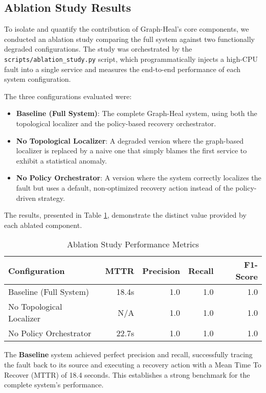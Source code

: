 \documentclass[11pt,conference]{IEEEtran}
\begin{document}
\subsection{Ablation Study Results}
To isolate and quantify the contribution of Graph-Heal's core components, we conducted an ablation study comparing the full system against two functionally degraded configurations. The study was orchestrated by the \texttt{scripts/ablation\_study.py} script, which programmatically injects a high-CPU fault into a single service and measures the end-to-end performance of each system configuration.

The three configurations evaluated were:
\begin{itemize}
    \item \textbf{Baseline (Full System)}: The complete Graph-Heal system, using both the topological localizer and the policy-based recovery orchestrator.
    \item \textbf{No Topological Localizer}: A degraded version where the graph-based localizer is replaced by a naive one that simply blames the first service to exhibit a statistical anomaly.
    \item \textbf{No Policy Orchestrator}: A version where the system correctly localizes the fault but uses a default, non-optimized recovery action instead of the policy-driven strategy.
\end{itemize}

The results, presented in Table \ref{tab:ablation-results}, demonstrate the distinct value provided by each ablated component.

\begin{table}[ht]
  \centering
  \caption{Ablation Study Performance Metrics}
  \label{tab:ablation-results}
  \begin{tabular}{lrrrr}
    \hline
    \textbf{Configuration} & \textbf{MTTR} & \textbf{Precision} & \textbf{Recall} & \textbf{F1-Score} \\
    \hline
    Baseline (Full System) & 18.4s & 1.0 & 1.0 & 1.0 \\
    No Topological Localizer & N/A & 1.0 & 1.0 & 1.0 \\
    No Policy Orchestrator & 22.7s & 1.0 & 1.0 & 1.0 \\
    \hline
  \end{tabular}
\end{table}

The \textbf{Baseline} system achieved perfect precision and recall, successfully tracing the fault back to its source and executing a recovery action with a Mean Time To Recover (MTTR) of 18.4 seconds. This establishes a strong benchmark for the complete system's performance.
\end{document}
